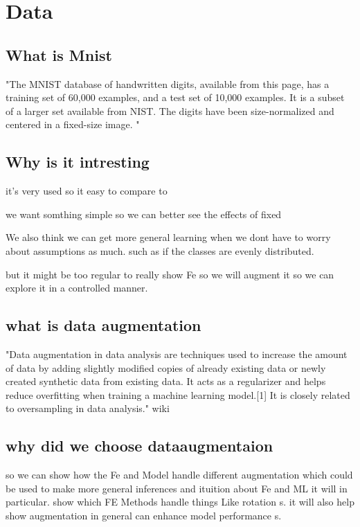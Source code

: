 \section{Data}

\subsection{What is Mnist}

"The MNIST database of handwritten digits, available from this page, has a training set of 60,000 examples, and a test set of 10,000 examples. It is a subset of a larger set available from NIST. The digits have been size-normalized and centered in a fixed-size image. "


\subsection{Why is it intresting}

it's very used so it easy to compare
to

we want somthing simple so we can better see the effects of fixed

We also think we can get more general learning when we dont have to worry about assumptions as much. such as if the classes are evenly distributed.


but it might be too regular to really show Fe so we will augment it so we can explore it in a controlled manner.


\subsection{what is data augmentation}

"Data augmentation in data analysis are techniques used to increase the amount of data by adding slightly modified copies of already existing data or newly created synthetic data from existing data. It acts as a regularizer and helps reduce overfitting when training a machine learning model.[1] It is closely related to oversampling in data analysis." wiki


\subsection{why did we choose dataaugmentaion}

so we can show how the Fe and Model handle different augmentation which could be used to make more general inferences and ituition about Fe and ML it will in particular. show which FE Methods handle things Like rotation s. it will also help show augmentation in general can enhance model performance s.

